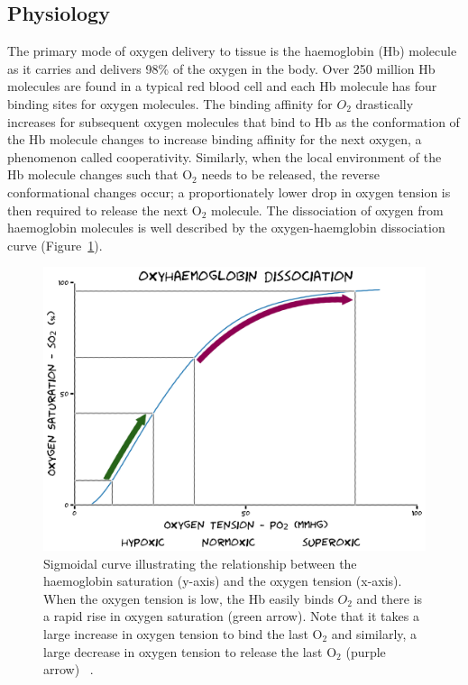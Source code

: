 \subsection{Physiology}
The primary mode of oxygen delivery to tissue is the haemoglobin (\acs{Hb}) molecule as it carries and delivers 98\% of the oxygen in the body. 
Over 250 million \acs{Hb} molecules are found in a typical red blood cell and each \acs{Hb} molecule has four binding sites for oxygen molecules. 
The binding affinity for ${O_2}$ drastically increases for subsequent oxygen molecules that bind to \acs{Hb} as the conformation of the \acs{Hb} molecule changes to increase binding affinity for the next oxygen, a phenomenon called cooperativity. 
Similarly, when the local environment of the \acs{Hb} molecule changes such that O$_2$ needs to be released, the reverse conformational changes occur; a proportionately lower drop in oxygen tension is then required to release the next O$_2$ molecule. 
The dissociation of oxygen from haemoglobin molecules is well described by the oxygen-haemglobin dissociation curve (Figure~\ref{HBdis}).

\begin{figure}
 \includegraphics[width=\textwidth]{./oemri_thesis1/oemri_thesis1-images/Hbdissociation.png}
 \caption{Sigmoidal curve illustrating the relationship between the haemoglobin saturation (y-axis) and the oxygen tension (x-axis). When the oxygen tension is low, the Hb easily binds $O_2$ and there is a rapid rise in oxygen saturation (green arrow). Note that it takes a large increase in oxygen tension to bind the last O$_2$ and similarly, a large decrease in oxygen tension to release the last O$_2$ (purple arrow) ~\cite{GomezCambronero:2001hu}.}
 \label{HBdis}
\end{figure}	

